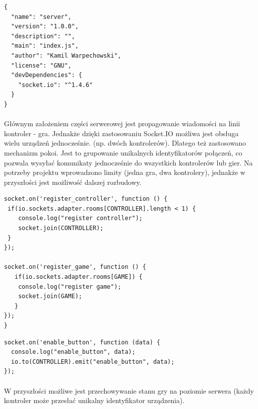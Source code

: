 \begin{lstlisting}[language=CSharp]
{
  "name": "server",
  "version": "1.0.0",
  "description": "",
  "main": "index.js",
  "author": "Kamil Warpechowski",
  "license": "GNU",
  "devDependencies": {
    "socket.io": "^1.4.6"
  }
}
\end{lstlisting}

\paragraph{}
Głównym założeniem części serwerowej jest propagowanie wiadomości na linii kontroler - gra. Jednakże dzięki zastosowaniu Socket.IO możliwa jest obsługa wielu urządzeń jednocześnie. (np. dwóch kontrolerów). Dlatego też zastosowano mechanizm pokoi. Jest to grupowanie unikalnych identyfikatorów połączeń, co pozwala wysyłać komunikaty jednocześnie do wszystkich kontrolerów lub gier. Na potrzeby projektu wprowadzono limity (jedna gra, dwa kontrolery), jednakże w przyszłości jest możliwość dalszej rozbudowy.

\begin{lstlisting}[language=CSharp]
socket.on('register_controller', function () {
 if(io.sockets.adapter.rooms[CONTROLLER].length < 1) {
	console.log("register controller");
	socket.join(CONTROLLER);
 }
});

socket.on('register_game', function () {
   if(io.sockets.adapter.rooms[GAME]) {
	console.log("register game");
	socket.join(GAME);
   }
});
}
\end{lstlisting}

\begin{lstlisting}[language=CSharp]
socket.on('enable_button', function (data) {
  console.log("enable_button", data);
  io.to(CONTROLLER).emit("enable_button", data);
});
\end{lstlisting}
\paragraph{}
W przyszłości możliwe jest przechowywanie stanu gry na poziomie serwera (każdy kontroler może przesłać unikalny identyfikator urządzenia).